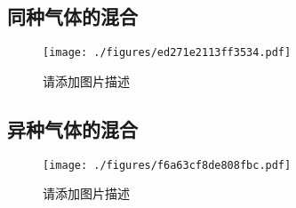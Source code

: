 

\begin{issues}
\issueDraft
\end{issues}

\subsection{同种气体的混合}
\begin{figure}[ht]
\centering
\texttt{[image: ./figures/ed271e2113ff3534.pdf]}
\caption{请添加图片描述} \label{fig_IGME_1}
\end{figure}

\subsection{异种气体的混合}
\begin{figure}[ht]
\centering
\texttt{[image: ./figures/f6a63cf8de808fbc.pdf]}
\caption{请添加图片描述} \label{fig_IGME_fig2}
\end{figure}